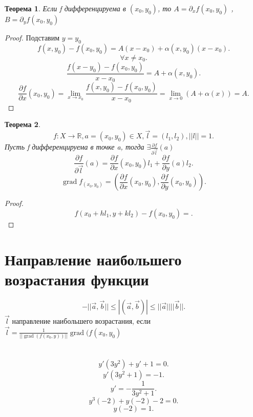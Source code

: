 \documentclass[14pt]{extarticle} \usepackage{fontspec}
\newtheorem{theorem}{Теорема}
\DeclareMathOperator{\grad}{grad}
\begin{document}
\begin{theorem}
    Если f дифференцируема в $(x_0,y_0)$, то $A = \partial_{x} f(x_0,y_0)$ , $B = \partial_{y} f(x_0,y_0)$
\end{theorem}
\begin{proof}
    Подставим $y = y_0$ 
    \[
    f(x,y_0) - f(x_0,y_0) = A(x - x_0) + \alpha(x,y_0) (x - x_0)
    .\] 
    \[
    \forall  x \neq x_0
    .\] 
    \[
    \frac{f(x - y_0) - f(x_0,y_0)}{x - x_0} = A + \alpha(x,y_0)
    .\] 
    \[
    \frac{\partial f}{\partial x} (x_0,y_0) = \lim_{x \to x_0} \frac{f(x,y_0) - f(x_0,y_0)}{x - x_0} = \lim_{x \to 0} (A + \alpha(x)) =A
    .\] 
\end{proof}
\begin{theorem}
    \[
        f: X \to \mathbb{R}, a  = (x_0,y_0) \in X, \vec{l} = (l_1,l_2) ,||l|| = 1
    .\] 
    Пусть f дифференцируема в точке a, тогда $\exists \frac{\partial f}{\partial \vec{l}} (a)$ 
    \[
    \frac{\partial f}{\partial \vec{l}} (a) = \frac{\partial f}{\partial x} (x_0,y_0) l_1 +  \frac{\partial f}{\partial y} (a) l_2
    .\] 
     \[
    \grad f_{(x_0,y_0)} =  (\frac{\partial f}{\partial x} (x_0,y_0), \frac{\partial f}{\partial y} (x_0,y_0))
    .\] 
\end{theorem}
\begin{proof}
        \[
        f(x_0 + hl_1, y + k l_2) - f(x_0,y_0) = 
        .\] 
    \end{proof}
\section{Направление наибольшего возрастания функции}
\[
- ||\vec{a},\vec{b}|| \le |(\vec{a},\vec{b})| \le ||\vec{a}|| ||\vec{b}||
.\] 
$\vec{l}$ направление наибольшего возрастания, если $\vec{l} = \frac{1}{||\grad(f(x_0,y))||} \grad(f(x_0,y_0)$
\section{}
\[
y' (3y^2) + y' + 1 = 0
.\] 
\[
y' (3y^2 + 1) = -1
.\] 
\[
y' = - \frac{1}{3y^2 + 1}
.\] 
\[
y^3(-2) + y(-2) -2 = 0
.\] 
\[
y(-2) = 1
.\] 
\end{document}
